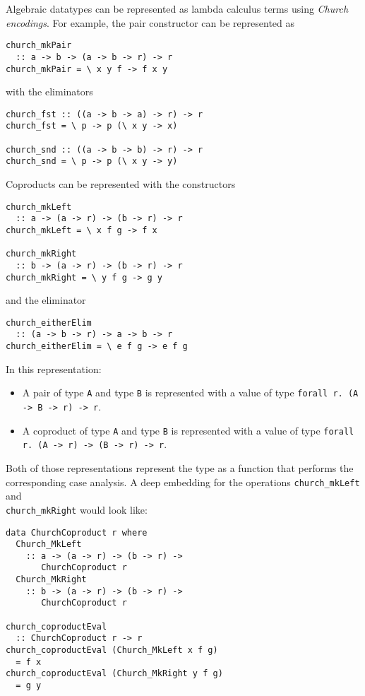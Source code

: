 \documentclass[sigplan,anonymous,review]{acmart}
\newcommand{\ttt}{\texttt}
\begin{document}
Algebraic datatypes can be represented as lambda calculus terms using
\textit{Church encodings}. For example, the pair constructor can be
represented as

\begin{lstlisting}
church_mkPair
  :: a -> b -> (a -> b -> r) -> r
church_mkPair = \ x y f -> f x y
\end{lstlisting}

with the eliminators

\begin{lstlisting}
church_fst :: ((a -> b -> a) -> r) -> r
church_fst = \ p -> p (\ x y -> x)

church_snd :: ((a -> b -> b) -> r) -> r
church_snd = \ p -> p (\ x y -> y)
\end{lstlisting}


Coproducts can be represented with the constructors

\begin{lstlisting}
church_mkLeft
  :: a -> (a -> r) -> (b -> r) -> r
church_mkLeft = \ x f g -> f x

church_mkRight
  :: b -> (a -> r) -> (b -> r) -> r
church_mkRight = \ y f g -> g y
\end{lstlisting}

and the eliminator

\begin{lstlisting}
church_eitherElim
  :: (a -> b -> r) -> a -> b -> r
church_eitherElim = \ e f g -> e f g
\end{lstlisting}

In this representation:

\begin{itemize}
  \item A pair of type \ttt{A} and type \ttt{B} is represented with a value of type
\ttt{forall r. (A -> B -> r) -> r}.

  \item A coproduct of type \ttt{A} and type \ttt{B} is represented with a value of type
\ttt{forall r. (A -> r) -> (B -> r) -> r}.
\end{itemize}

Both of those representations represent the type as a function that performs the
corresponding case analysis. A deep embedding for the operations
\ttt{church\_mkLeft} and \\ \ttt{church\_mkRight} would look
like:

\begin{lstlisting}
data ChurchCoproduct r where
  Church_MkLeft
    :: a -> (a -> r) -> (b -> r) ->
       ChurchCoproduct r
  Church_MkRight
    :: b -> (a -> r) -> (b -> r) ->
       ChurchCoproduct r

church_coproductEval
  :: ChurchCoproduct r -> r
church_coproductEval (Church_MkLeft x f g)
  = f x
church_coproductEval (Church_MkRight y f g)
  = g y
\end{lstlisting}
\end{document}
